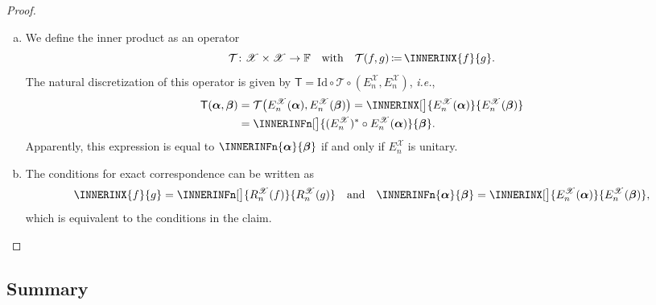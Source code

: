 \documentclass[a4paper]{paper}
\newcommand*{\SPC}[1]{{\ensuremath{\mathscr{#1}}}}
\newcommand*{\SPCX}{\SPC{X}}
\newcommand*{\FIELD}{{\ensuremath{\mathbb{F}}}}
\newcommand*{\OP}[1]{{\ensuremath{\mathcal{#1}}}}
\newcommand*{\OPT}{\OP{T}}
\newcommand*{\OPID}{\OP{\mathrm{Id}}}
\newcommand{\DISCOP}[1]{{\ensuremath{\mathsf{#1}}}}
\newcommand*{\DISCOPT}{\DISCOP{T}}
\newcommand*{\EXT}[2]{\ensuremath{E_{#1}^{#2}}}
\newcommand*{\REST}[2]{\ensuremath{R_{#1}^{#2}}}
\newcommand*{\RnX}{{\ensuremath{\REST{n}{\SPC{X}}}}}
\newcommand*{\EnX}{{\ensuremath{\EXT{n}{\SPC{X}}}}}
\DeclareMathOperator{\DEFEQ}{{\coloneqq}}
\newcommand*{\ie}{\textsl{i.e.}\xspace}
\newcommand*{\BDalpha}{\boldsymbol{\alpha}}
\newcommand*{\BDbeta}{\boldsymbol{\beta}}
\begin{document}
\begin{proof}~
 \begin{enumerate}[(a)]
  \item We define the inner product as an operator
  \begin{equation*}
   \OPT \colon \SPCX \times \SPCX \to \FIELD
   \quad \text{with} \quad
   \OPT(f, g) \DEFEQ  \INNERINX{f}{g}.
  \end{equation*}
  The natural discretization of this operator is given by $\DISCOPT = \OPID \circ \OPT \circ (\EnX, \EnX)$, \ie,
  \begin{align*}
   \DISCOPT(\BDalpha, \BDbeta) 
   &= \OPT\big( \EnX(\BDalpha), \EnX(\BDbeta) \big) 
   = \INNERINX[\big]{\EnX(\BDalpha)}{\EnX(\BDbeta)} \\
   &= \INNERINFn[\big]{(\EnX)^* \circ \EnX(\BDalpha)}{\BDbeta}.
  \end{align*}
  Apparently, this expression is equal to $\INNERINFn{\BDalpha}{\BDbeta}$ if and only if $\EnX$ is unitary.

  \item The conditions for exact correspondence can be written as
  \begin{equation*}
   \INNERINX{f}{g} = \INNERINFn[\big]{\RnX(f)}{\RnX(g)}
   \quad \text{and} \quad
   \INNERINFn{\BDalpha}{\BDbeta} = \INNERINX[\big]{\EnX(\BDalpha)}{\EnX(\BDbeta)},
  \end{equation*}
  which is equivalent to the conditions in the claim.
 \end{enumerate}
\end{proof}



\subsection{Summary}
\label{subsec:prop:summary}
\end{document}
